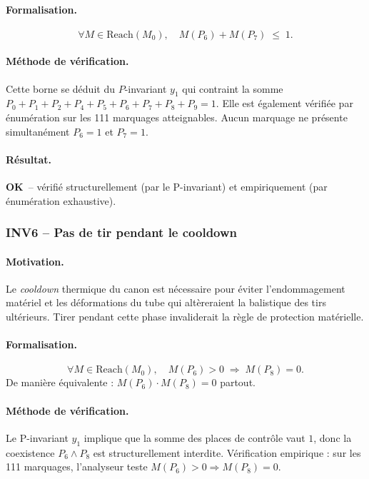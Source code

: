 \documentclass[11pt,a4paper]{article}
\newcommand{\OK}{\textcolor{green!50!black}{\textbf{OK}}}
\begin{document}
\paragraph{Formalisation.}
\[
\forall M \in \mathrm{Reach}(M_0),\quad M(P_6) + M(P_7) \;\leq\; 1.
\]

\paragraph{Méthode de vérification.}
Cette borne se déduit du $P$-invariant $y_1$ qui contraint la somme
$P_0 + P_1 + P_2 + P_4 + P_5 + P_6 + P_7 + P_8 + P_9 = 1$. Elle est
également vérifiée par énumération sur les 111 marquages atteignables.
Aucun marquage ne présente simultanément $P_6 = 1$ et $P_7 = 1$.

\paragraph{Résultat.}
\OK\ -- vérifié structurellement (par le P-invariant) et empiriquement
(par énumération exhaustive).

\subsubsection*{INV6 -- Pas de tir pendant le cooldown}

\paragraph{Motivation.}
Le \emph{cooldown} thermique du canon est nécessaire pour éviter
l'endommagement matériel et les déformations du tube qui altèreraient la
balistique des tirs ultérieurs. Tirer pendant cette phase invaliderait la
règle de protection matérielle.

\paragraph{Formalisation.}
\[
\forall M \in \mathrm{Reach}(M_0),\quad M(P_6) > 0 \;\Longrightarrow\; M(P_8) = 0.
\]
De manière équivalente : $M(P_6) \cdot M(P_8) = 0$ partout.

\paragraph{Méthode de vérification.}
Le P-invariant $y_1$ implique que la somme des places de contrôle vaut $1$,
donc la coexistence $P_6 \wedge P_8$ est structurellement interdite.
Vérification empirique : sur les 111 marquages, l'analyseur teste
$M(P_6) > 0 \Rightarrow M(P_8) = 0$.
\end{document}
